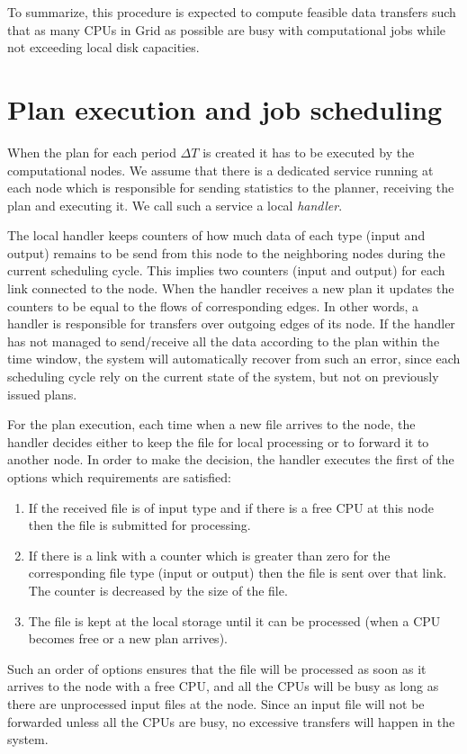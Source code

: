 \documentclass{svjour3}                     %
\begin{document}
To summarize, this procedure is expected to compute feasible data transfers 
such that as many CPUs in Grid as possible are busy with computational jobs while not exceeding local disk capacities.

\section{Plan execution and job scheduling}
\label{plan-execution}
When the plan for each period $\Delta T$ is created it has to be executed by the computational
nodes. We assume that there is a dedicated service running at each node
which is responsible for sending statistics to the planner, receiving the plan and executing it. We call such a service a local \textit{handler}.

The local handler keeps counters of how much data of each type (input and output) remains to be send from this node to the neighboring nodes during the current scheduling cycle. This implies two counters (input and output) for each link connected to the node. When the handler receives a new plan it updates the counters to be equal to the flows of corresponding edges. In other words, a handler is responsible for transfers over outgoing edges of its node. If the handler has not managed to send/receive all the data according to the plan within the time window, the system will automatically recover from such an error, since each scheduling cycle rely on the current state of the system, but not on previously issued plans.  

For the plan execution, each time when a new file arrives to the node, the handler decides either to keep the file for local processing or to forward it to another node. In order to make the decision, the handler executes the first of the options which requirements are satisfied:

\begin{enumerate}
\item If the received file is of input type and if there is a free CPU at this node then the file is submitted for processing.
\item If there is a link with a counter which is greater than zero for the corresponding file type (input or output) then the file is sent over that link. The counter is decreased by the size of the file.
\item The file is kept at the local storage until it can be processed (when a CPU becomes free  or a new plan arrives).
\end{enumerate}
Such an order of options ensures that the file will be processed as soon as it arrives to the node with a free CPU, and all the CPUs will be busy as long as there are unprocessed input files at the node. Since an input file will not be forwarded unless all the CPUs are busy, no excessive transfers will happen in the system.
\end{document}
